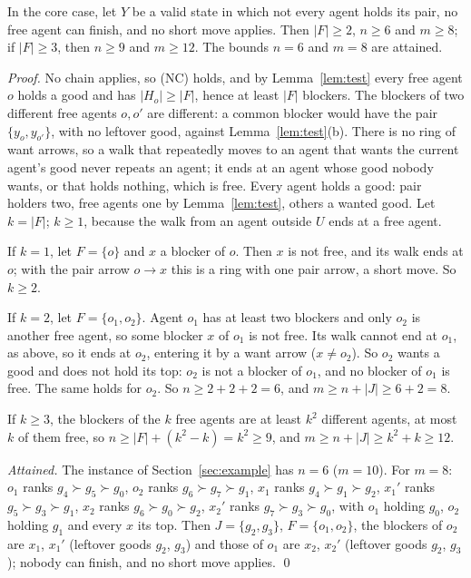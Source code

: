 \documentclass[runningheads,11pt]{llncs}
\begin{document}
\begin{proposition}\label{prop:short}
In the core case, let $Y$ be a valid state in which not every agent holds its pair, no free agent can finish, and no short move applies. Then $|F|\ge2$, $n\ge6$ and $m\ge8$; if $|F|\ge3$, then $n\ge9$ and $m\ge12$. The bounds $n=6$ and $m=8$ are attained.
\end{proposition}

\begin{proof}
No chain applies, so (NC) holds, and by Lemma~\ref{lem:test} every free agent $o$ holds a good and has $|H_o|\ge|F|$, hence at least $|F|$ blockers. The blockers of two different free agents $o,o'$ are different: a common blocker would have the pair $\{y_o,y_{o'}\}$, with no leftover good, against Lemma~\ref{lem:test}(b). There is no ring of want arrows, so a walk that repeatedly moves to an agent that wants the current agent's good never repeats an agent; it ends at an agent whose good nobody wants, or that holds nothing, which is free. Every agent holds a good: pair holders two, free agents one by Lemma~\ref{lem:test}, others a wanted good. Let $k=|F|$; $k\ge1$, because the walk from an agent outside $U$ ends at a free agent.

If $k=1$, let $F=\{o\}$ and $x$ a blocker of $o$. Then $x$ is not free, and its walk ends at $o$; with the pair arrow $o\to x$ this is a ring with one pair arrow, a short move. So $k\ge2$.

If $k=2$, let $F=\{o_1,o_2\}$. Agent $o_1$ has at least two blockers and only $o_2$ is another free agent, so some blocker $x$ of $o_1$ is not free. Its walk cannot end at $o_1$, as above, so it ends at $o_2$, entering it by a want arrow ($x\ne o_2$). So $o_2$ wants a good and does not hold its top: $o_2$ is not a blocker of $o_1$, and no blocker of $o_1$ is free. The same holds for $o_2$. So $n\ge2+2+2=6$, and $m\ge n+|J|\ge6+2=8$.

If $k\ge3$, the blockers of the $k$ free agents are at least $k^2$ different agents, at most $k$ of them free, so $n\ge|F|+(k^2-k)=k^2\ge9$, and $m\ge n+|J|\ge k^2+k\ge12$.

\emph{Attained.} The instance of Section~\ref{sec:example} has $n=6$ ($m=10$). For $m=8$: $o_1$ ranks $g_4\succ g_5\succ g_0$, $o_2$ ranks $g_6\succ g_7\succ g_1$, $x_1$ ranks $g_4\succ g_1\succ g_2$, $x_1'$ ranks $g_5\succ g_3\succ g_1$, $x_2$ ranks $g_6\succ g_0\succ g_2$, $x_2'$ ranks $g_7\succ g_3\succ g_0$, with $o_1$ holding $g_0$, $o_2$ holding $g_1$ and every $x$ its top. Then $J=\{g_2,g_3\}$, $F=\{o_1,o_2\}$, the blockers of $o_2$ are $x_1$, $x_1'$ (leftover goods $g_2$, $g_3$) and those of $o_1$ are $x_2$, $x_2'$ (leftover goods $g_2$, $g_3$); nobody can finish, and no short move applies. \qed
\end{proof}
\end{document}
